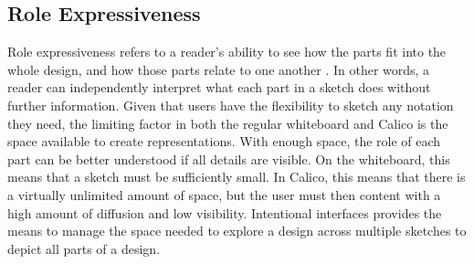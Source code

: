 \documentclass[12pt,fleqn]{ucithesis}
\begin{document}



\subsection{Role Expressiveness}

Role expressiveness refers to a reader's ability to see how the parts fit into the whole design, and how those parts relate to one another \cite{Petre2013BookChapter}. In other words, a reader can independently interpret what each part in a sketch does without further information. Given that users have the flexibility to sketch any notation they need, the limiting factor in both the regular whiteboard and Calico is the space available to create representations. With enough space, the role of each part can be better understood if all details are visible. On the whiteboard, this means that a sketch must be sufficiently small. In Calico, this means that there is a virtually unlimited amount of space, but the user must then content with a high amount of diffusion and low visibility. Intentional interfaces provides the means to manage the space needed to explore a design across multiple sketches to depict all parts of a design.
\end{document}
